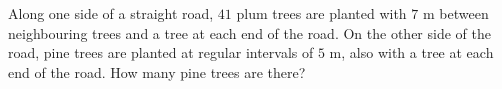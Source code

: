 Along one side of a straight road, $41$ plum trees are planted with $7$ m between neighbouring trees and a tree at each end of the road. On the other side of the road, pine trees are planted at regular intervals of $5$ m, also with a tree at each end of the road. How many pine trees are there?
